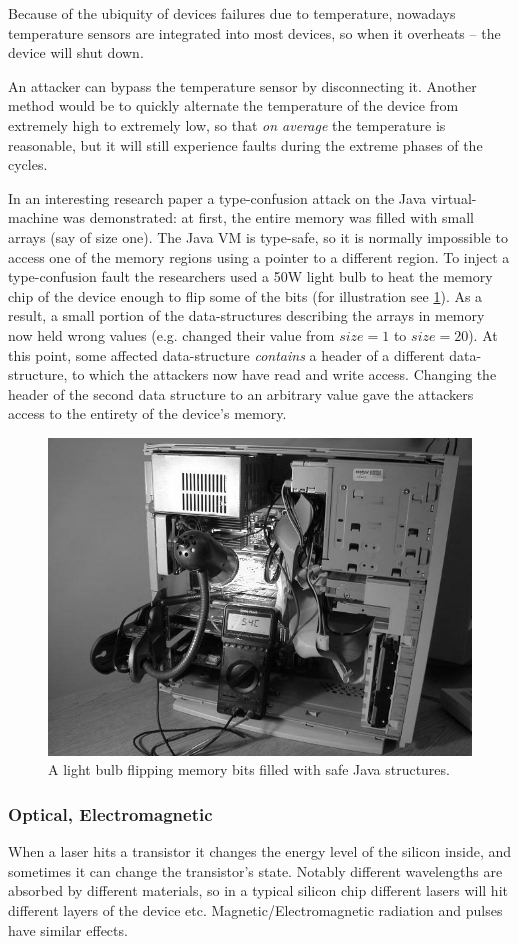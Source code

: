 Because of the ubiquity of devices failures due to temperature, nowadays temperature sensors are integrated into most devices, so when it overheats -- the device will shut down.

An attacker can bypass the temperature sensor by disconnecting it. Another method would be to quickly alternate the temperature of the device from extremely high to extremely low, so that \emph{on average} the temperature is reasonable, but it will still experience faults during the extreme phases of the cycles.

In an interesting research paper \cite{appel} a type-confusion attack on the Java virtual-machine was demonstrated: at first, the entire memory was filled with small arrays (say of size one). The Java VM is type-safe, so it is normally impossible to access one of the memory regions using a pointer to a different region. To inject a type-confusion fault the researchers used a 50W light bulb to heat the memory chip of the device enough to flip some of the bits (for illustration see \cref{fig:memory_lightbulb}). As a result, a small portion of the data-structures describing the arrays in memory now held wrong values (e.g. changed their value from $size=1$ to $size=20$). At this point, some affected data-structure \emph{contains} a header of a different data-structure, to which the attackers now have read and write access. Changing the header of the second data structure to an arbitrary value gave the attackers access to the entirety of the device's memory.
\begin{figure}[!ht]
	\centering
	\includegraphics[width=0.7\linewidth]{images/ch9/bulb.png}
	\caption{A light bulb flipping memory bits filled with safe Java structures.}
	\label{fig:memory_lightbulb}
\end{figure}

\subsubsection{Optical, Electromagnetic}
When a laser hits a transistor it changes the energy level of the silicon inside, and sometimes it can change the transistor's state. Notably different wavelengths are absorbed by different materials, so in a typical silicon chip different lasers will hit different layers of the device etc. Magnetic/Electromagnetic radiation and pulses have similar effects.

